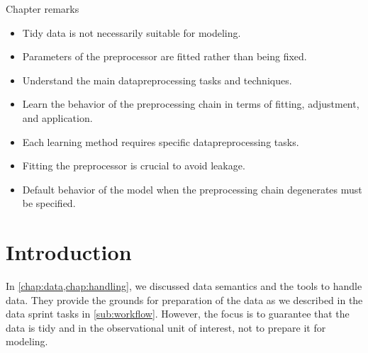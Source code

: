 \begin{mainbox}{Chapter remarks}


  \startcontents[chapters]
  \vspace{1em}


  \begin{itemize}
    \itemsep0em
    \item Tidy data is not necessarily suitable for modeling.
    \item Parameters of the \gls{preprocessor} are fitted rather than being fixed.
  \end{itemize}


  \begin{itemize}
    \itemsep0em
    \item Understand the main \gls{datapreprocessing} tasks and techniques.
    \item Learn the behavior of the preprocessing chain in terms of fitting, adjustment,
      and application.
  \end{itemize}


  \begin{itemize}
    \itemsep0em
    \item Each learning method requires specific \gls{datapreprocessing} tasks.
    \item Fitting the \gls{preprocessor} is crucial to avoid \gls{leakage}.
    \item Default behavior of the model when the preprocessing chain degenerates must be
      specified.
  \end{itemize}
\end{mainbox}

{}
\clearpage

\section{Introduction}

In \cref{chap:data,chap:handling}, we discussed data semantics and the tools to
handle data.  They provide the grounds for preparation of the data as we described in the
data sprint tasks in \cref{sub:workflow}.  However, the focus is to guarantee that the
data is tidy and in the observational unit of interest, not to prepare it for modeling.

